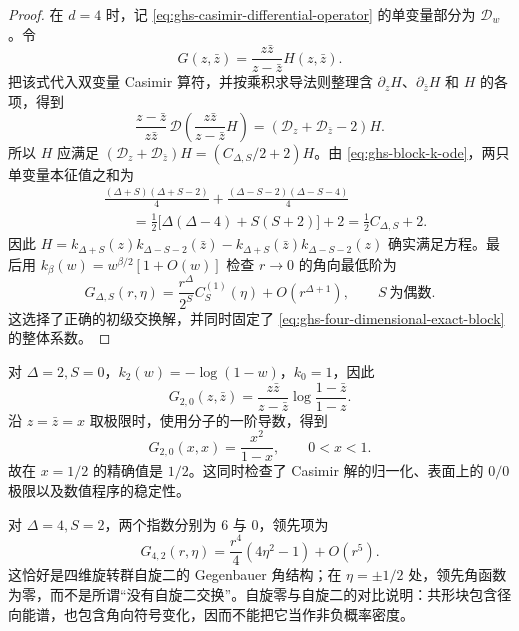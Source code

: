 \begin{proof}
在 $d=4$ 时，记 \cref{eq:ghs-casimir-differential-operator} 的单变量部分为 $\mathcal D_w$。令
\begin{equation*}
G(z,\bar z)=\frac{z\bar z}{z-\bar z}H(z,\bar z).
\end{equation*}
把该式代入双变量 Casimir 算符，并按乘积求导法则整理含 $\partial_zH$、$\partial_{\bar z}H$ 和 $H$ 的各项，得到
\begin{equation*}
\frac{z-\bar z}{z\bar z}\,\mathcal D
\left(\frac{z\bar z}{z-\bar z}H\right)
=(\mathcal D_z+\mathcal D_{\bar z}-2)H.
\end{equation*}
所以 $H$ 应满足 $\left(\mathcal D_z+\mathcal D_{\bar z}\right)H=(C_{\Delta,S}/2+2)H$。由 \cref{eq:ghs-block-k-ode}，两只单变量本征值之和为
\begin{align*}
&\frac{(\Delta+S)(\Delta+S-2)}4
+\frac{(\Delta-S-2)(\Delta-S-4)}4\\
&\qquad=\frac12\bigl[\Delta(\Delta-4)+S(S+2)\bigr]+2
=\frac12C_{\Delta,S}+2.
\end{align*}
因此 $H=k_{\Delta+S}(z)k_{\Delta-S-2}(\bar z)
-k_{\Delta+S}(\bar z)k_{\Delta-S-2}(z)$ 确实满足方程。最后用 $k_\beta(w)=w^{\beta/2}[1+O(w)]$ 检查 $r\to0$ 的角向最低阶为
\begin{equation*}
G_{\Delta,S}(r,\eta)=\frac{r^\Delta}{2^S}
C_S^{(1)}(\eta)+O(r^{\Delta+1}),
\qquad S\ \text{为偶数}.
\end{equation*}
这选择了正确的初级交换解，并同时固定了 \cref{eq:ghs-four-dimensional-exact-block} 的整体系数。
\end{proof}

对 $\Delta=2,S=0$，$k_2(w)=-\log(1-w)$，$k_0=1$，因此
\begin{equation}\label{eq:ghs-d4-block-20}
 G_{2,0}(z,\bar z)=\frac{z\bar z}{z-\bar z}
 \log\frac{1-\bar z}{1-z}.
\end{equation}
沿 $z=\bar z=x$ 取极限时，使用分子的一阶导数，得到
\begin{equation}\label{eq:ghs-d4-block-diagonal}
 G_{2,0}(x,x)=\frac{x^2}{1-x},\qquad 0<x<1.
\end{equation}
故在 $x=1/2$ 的精确值是 $1/2$。这同时检查了 Casimir 解的归一化、表面上的 $0/0$ 极限以及数值程序的稳定性。

对 $\Delta=4,S=2$，两个指数分别为 $6$ 与 $0$，领先项为
\begin{equation}\label{eq:ghs-d4-block-42-leading}
 G_{4,2}(r,\eta)=\frac{r^4}{4}(4\eta^2-1)+O(r^5).
\end{equation}
这恰好是四维旋转群自旋二的 Gegenbauer 角结构；在 $\eta=\pm1/2$ 处，领先角函数为零，而不是所谓“没有自旋二交换”。自旋零与自旋二的对比说明：共形块包含径向能谱，也包含角向符号变化，因而不能把它当作非负概率密度。


